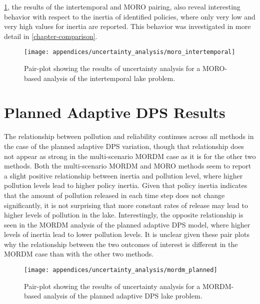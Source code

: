 \cref{fig:pairplot-moro-inter}, the results of the intertemporal and MORO pairing, also reveal interesting behavior with respect to the inertia of identified policies, where only very low and very high values for inertia are reported. This behavior was investigated in more detail in \cref{chapter-comparison}. 

\begin{figure}[H]
    \centering
    
    \texttt{[image: appendices/uncertainty\_analysis/moro\_intertemporal]}
    \caption[Intertemporal + MORO pair plot]{Pair-plot showing the results of uncertainty analysis for a MORO-based analysis of the intertemporal lake problem.}
    \label{fig:pairplot-moro-inter}
\end{figure}

\newpage

\section{Planned Adaptive DPS Results} \label{pairplots-planned}
The relationship between pollution and reliability continues across all methods in the case of the planned adaptive DPS variation, though that relationship does not appear as strong in the multi-scenario MORDM case as it is for the other two methods. Both the multi-scenario MORDM and MORO methods seem to report a slight positive relationship between inertia and pollution level, where higher pollution levels lead to higher policy inertia. Given that policy inertia indicates that the amount of pollution released in each time step does not change significantly, it is not surprising that more constant rates of release may lead to higher levels of pollution in the lake. Interestingly, the opposite relationship is seen in the MORDM analysis of the planned adaptive DPS model, where higher levels of inertia lead to lower pollution levels. It is unclear given these pair plots why the relationship between the two outcomes of interest is different in the MORDM case than with the other two methods. 

\begin{figure}[H]
    \centering
    
    \texttt{[image: appendices/uncertainty\_analysis/mordm\_planned]}
    \caption[Planned adaptive DPS + MORDM pair plot]{Pair-plot showing the results of uncertainty analysis for a MORDM-based analysis of the planned adaptive DPS lake problem.}
    \label{fig:pairplot-mordm-planned}
\end{figure}

